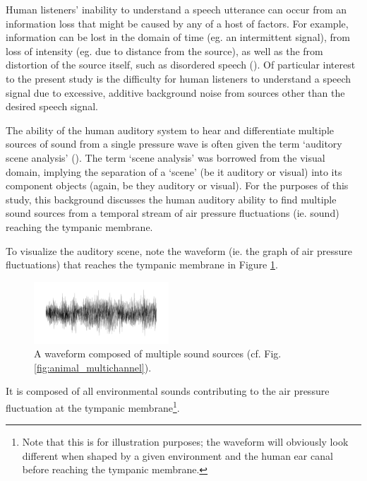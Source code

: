 Human listeners' inability to understand a speech utterance can occur from an information loss that might be caused by any of a host of factors.  For example, information can be lost in the domain of time (eg. an intermittent signal), from loss of intensity (eg. due to distance from the source), as well as the from distortion of the source itself, such as disordered speech (\cite{mattys:12}).  Of particular interest to the present study is the difficulty for human listeners to understand a speech signal due to excessive, additive background noise from sources other than the desired speech signal.

The ability of the human auditory system to hear and differentiate multiple sources of sound from a single pressure wave is often given the term `auditory scene analysis' (\cite{bregman:94}).  The term `scene analysis' was borrowed from the visual domain, implying the separation of a `scene' (be it auditory or visual) into its component objects (again, be they auditory or visual). For the purposes of this study, this background discusses the human auditory ability to find multiple sound sources from a temporal stream of air pressure fluctuations (ie. sound) reaching the tympanic membrane.

To visualize the auditory scene, note the waveform (ie. the graph of air pressure fluctuations) that reaches the tympanic membrane in Figure \ref{fig:animal_singlechannel}.  
%
\begin{figure}
\centering
  \includegraphics[width=0.45\textwidth]{figure/single-channel-animals.png}
  \caption{A waveform composed of multiple sound sources (cf. Fig. \ref{fig:animal_multichannel}).}
  \label{fig:animal_singlechannel}
\end{figure}
%
It is composed of all environmental sounds contributing to the air pressure fluctuation at the tympanic membrane\footnote{Note that this is for illustration purposes; the waveform will obviously look different when shaped by a given environment and the human ear canal before reaching the tympanic membrane.}.

